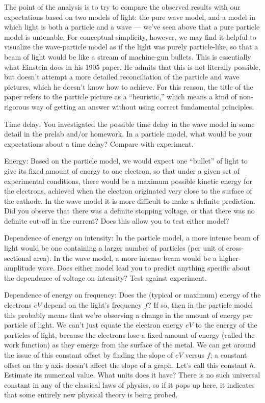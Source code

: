 The point of the analysis is to try to compare the observed results with our expectations based
on two models of light:
the pure wave model, and a model in which light is both a particle and a wave --- we've seen
above that a pure particle model is untenable. For conceptual simplicity, however, we may find
it helpful to visualize the wave-particle model as if the light was purely particle-like, so
that a beam of light would be like a stream of machine-gun bullets. This is essentially what
Einstein does in his 1905 paper. He admits that this is not literally possible, but doesn't attempt
a more detailed reconciliation of the particle and wave pictures, which he doesn't know how to
achieve. For this reason, the title of the paper refers to the particle picture as a ``heuristic,''
which means a kind of non-rigorous way of getting an answer without using correct fundamental principles.

Time delay: You investigated the possible time delay in the wave model in some detail in the
prelab and/or homework. In a particle model, what would be your expectations about a time
delay? Compare with experiment.

Energy: Based on the particle model, we would expect one ``bullet'' of light to give its fixed
amount of energy to one electron, so that under a given set of experimental conditions, there
would be a maximum possible kinetic energy for the electrons, achieved when the electron originated
very close to the surface of the cathode. In the wave model it is more difficult to make a definite
prediction. Did you observe that there was a definite stopping voltage, or that there was no definite
cut-off in the current? Does this allow you to test either model?

Dependence of energy on intensity: In the particle model, a more intense beam of light would be
one containing a larger number of particles (per unit of cross-sectional area). In the wave model,
a more intense beam would be a higher-amplitude wave. Does either model lead you to predict anything
specific about the dependence of voltage on intensity? Test against experiment. 

Dependence of energy on frequency: Does the (typical or maximum) energy of the electrons $eV$
depend on the light's frequency $f$? If so, then in the particle model this probably means that
we're observing a change in the amount of energy per particle of light. We can't just equate the electron energy $eV$
to the energy of the particles of light, because the electrons lose a fixed amount of energy (called the
work function) as they emerge from the surface of the metal. We can get around the issue of this constant
offset by finding the slope of $eV$ versus $f$; a constant offset on the $y$ axis doesn't affect the slope
of a graph. Let's call this constant $h$. Estimate its numerical value. What units does it have?
There is no such universal constant in any of the classical laws of physics, so if it pops up here,
it indicates that some entirely new physical theory is being probed.

